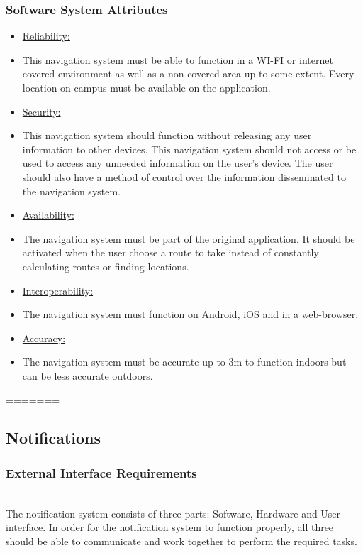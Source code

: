 \documentclass[runningheads,a4paper]{article}
\begin{document}
\subsubsection {Software System Attributes}
\begin{itemize}
\item \underline{Reliability:} 
\item This navigation system must be able to function in a WI-FI or internet covered environment as well as a non-covered area up to some extent. Every location on campus must be available on the application. 

\item \underline{Security:}
\item This navigation system should function without releasing any user information to other devices. This navigation system should not access or be used to access any unneeded information on the user’s device. 
The user should also have a method of control over the information disseminated to the navigation system.

\item \underline{Availability:}
\item The navigation system must be part of the original application. It should be activated when the user choose a route to take instead of constantly calculating routes or finding locations. 

\item \underline{Interoperability:}
\item The navigation system must function on Android, iOS and in a web-browser.

\item \underline{Accuracy:}
\item The navigation system must be accurate up to 3m to function indoors but can be less accurate outdoors. 
\end{itemize}

=======
\subsection {Notifications}



\subsubsection{External Interface Requirements}
\mbox{}\\
The notification system consists of three parts: Software, Hardware and User interface. In order for the notification system to function properly, all three should be able to communicate and work together to perform the required tasks. 
\end{document}

